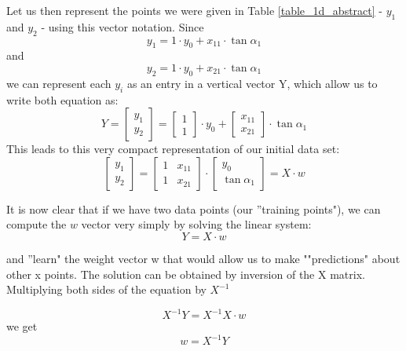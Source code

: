 Let us then represent the points we were given in Table \ref{table_1d_abstract}  - $y_1$ and $y_2$ - using this vector notation. Since
\begin{equation}
y_1 =
1 \cdot y_0 + x_{11} \cdot \tan\alpha_1
\end{equation}
and
\begin{equation}
y_2 =
1 \cdot y_0 + x_{21} \cdot \tan\alpha_1
\end{equation}
we can represent each $y_i$ as an entry in a vertical vector Y, which allow us to write both equation as:
\begin{equation}
Y = \begin{bmatrix}
y_1 \\
y_2
\end{bmatrix}
=
\begin{bmatrix}
1 \\
1
\end{bmatrix}
\cdot y_0
+
\begin{bmatrix}
x_{11} \\
x_{21}
\end{bmatrix}
\cdot 
\tan\alpha_1
\label{equation_comb_of_dimension_vectors}
\end{equation}
This leads to this very compact representation of our initial data set:
\begin{equation}
\begin{bmatrix}
y_1 \\
y_2
\end{bmatrix}
=
\begin{bmatrix}
1 & x_{11} \\
1 & x_{21}
\end{bmatrix}
\cdot
\begin{bmatrix}
y_0 \\ 
\tan\alpha_1
\end{bmatrix} = X \cdot w
\end{equation}

It is now clear that if we have two data points (our ''training points"), we can compute the $w$ vector very simply by solving the linear system:
\begin{equation}
Y = X \cdot w
\end{equation}

and ''learn" the weight vector w that would allow us to make ""predictions" about other x points. The solution can be obtained by inversion of the X matrix.  Multiplying both sides of the equation by $X^{-1}$

\begin{equation}
X^{-1} Y = X^{-1}X \cdot w
\end{equation}
we get
\begin{equation}
w = X^{-1} Y
\label{slope_equation}
\end{equation}

